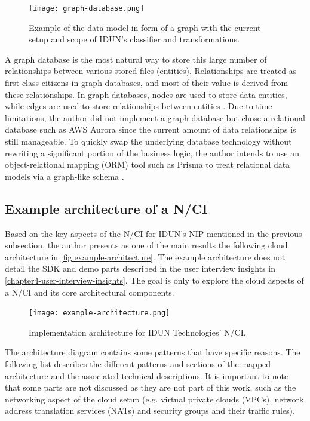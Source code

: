 \begin{figure}[!ht]
  \centering
  \texttt{[image: graph-database.png]}
  \caption{Example of the data model in form of a graph with the current setup and scope of IDUN's classifier and transformations.}
  \label{fig:graph-database}
\end{figure}

\newpage

A graph database is the most natural way to store this large number of relationships between various stored files (entities). Relationships are treated as first-class citizens in graph databases, and most of their value is derived from these relationships. In graph databases, nodes are used to store data entities, while edges are used to store relationships between entities \citep{amazon_web_services_inc_what_nodate}. Due to time limitations, the author did not implement a graph database but chose a relational database such as AWS Aurora since the current amount of data relationships is still manageable. To quickly swap the underlying database technology without rewriting a significant portion of the business logic, the author intends to use an object-relational mapping (ORM) tool such as Prisma to treat relational data models via a graph-like schema \citep{prisma_data_nodate}.

\subsection{Example architecture of a N/CI}
\label{chapter5-example-architecture-of-a-nci}

Based on the key aspects of the N/CI for IDUN's NIP mentioned in the previous subsection, the author presents as one of the main results the following cloud architecture in \autoref{fig:example-architecture}. The example architecture does not detail the SDK and demo parts described in the user interview insights in \autoref{chapter4-user-interview-insights}. The goal is only to explore the cloud aspects of a N/CI and its core architectural components.

\begin{figure}[!ht]
  \centering
  \texttt{[image: example-architecture.png]}
  \caption{Implementation architecture for IDUN Technologies' N/CI.}
  \label{fig:example-architecture}
\end{figure}

The architecture diagram contains some patterns that have specific reasons. The following list describes the different patterns and sections of the mapped architecture and the associated technical descriptions. It is important to note that some parts are not discussed as they are not part of this work, such as the networking aspect of the cloud setup (e.g. virtual private clouds (VPCs), network address translation services (NATs) and security groups and their traffic rules).

